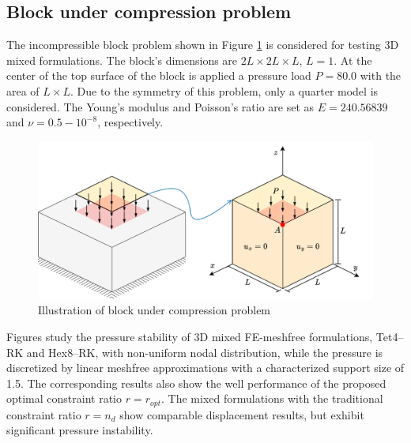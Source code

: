 \subsection{Block under compression problem}
The incompressible block problem shown in Figure \ref{fg:block_model} is considered for testing 3D mixed formulations. The block's dimensions are $2L\times 2L \times L$, $L=1$.
At the center of the top surface of the block is applied a pressure load $P = 80.0$ with the area of $L\times L$.
Due to the symmetry of this problem, only a quarter model is considered.
The Young's modulus and Poisson's ratio are set as $E = 240.56839$ and $\nu = 0.5-10^{-8}$, respectively.

\begin{figure}[H]
\centering
\includegraphics[width=\textwidth]{png/block.png}
\caption{Illustration of block under compression problem}\label{fg:block_model}
\end{figure}

Figures study the pressure stability of 3D mixed FE-meshfree formulations, Tet4--RK and Hex8--RK, with non-uniform nodal distribution, while the pressure is discretized by linear meshfree approximations with a characterized support size of 1.5. The corresponding results also show the well performance of the proposed optimal constraint ratio $r=r_{opt}$. The mixed formulations with the traditional constraint ratio $r=n_d$ show comparable displacement results, but exhibit significant pressure instability.


